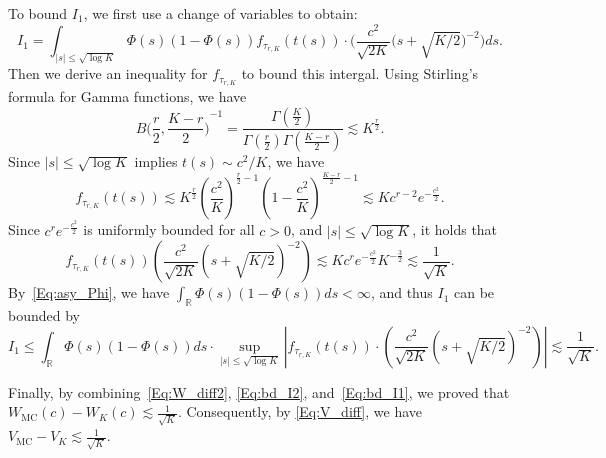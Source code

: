 \documentclass[%
onefignum,onetabnum]{siamonline250211}
\newcommand{\bbR}{\mathbb R}
\begin{document}
To bound $I_1$, we first use a change of variables to obtain:
\begin{equation}
    I_1=\int_{|s|\leq \sqrt{\log{K}}}\Phi \left( s \right)\left( 1-\Phi \left( s \right) \right) f_{\tau_{r,K}}(t(s))\cdot \Big( \frac{c^2}{\sqrt{2K}}\big( s+\sqrt{{K}/{2}} \big)^{-2} \Big) ds.
\end{equation}
Then we derive an inequality for $f_{\tau_{r,K}}$ to bound this intergal. Using Stirling's formula for Gamma functions, we have
\begin{equation*}
    {B\Big( \frac{r}{2},\frac{K-r}{2} \Big)}^{-1}=\frac{\Gamma(\frac{K}{2})}{\Gamma(\frac{r}{2})\Gamma(\frac{K-r}{2})}\lesssim K^{\frac{r}{2}}.
\end{equation*}
Since $|s|\leq \sqrt{\log{K}}$ implies $t(s)\sim {c^2}/{K}$, we have 
\begin{equation*}
    f_{\tau_{r,K}}(t(s))\lesssim K^{\frac{r}{2}} \left( \frac{c^2}{K} \right)^{\frac{r}{2}-1} \left( 1-\frac{c^2}{K} \right)^{\frac{K-r}{2}-1} \lesssim K c^{r-2}e^{-\frac{c^2}{2}}.
\end{equation*}
Since $c^re^{-\frac{c^2}{2}}$ is uniformly bounded for all $c>0$, and $|s|\leq \sqrt{\log{K}}$, it holds that
\begin{equation*}
    f_{\tau_{r,K}}(t(s)) \left( \frac{c^2}{\sqrt{2K}}\left( s+\sqrt{{K}/{2}} \right)^{-2} \right)\lesssim K c^{r}e^{-\frac{c^2}{2}}K^{-\frac{3}{2}}\lesssim\frac{1}{\sqrt{K}}.
\end{equation*}
%
By~\eqref{Eq:asy_Phi}, we have $\int_\bbR \Phi \left( s \right)\left( 1-\Phi \left( s \right) \right)ds <\infty$, and thus $I_1$ can be bounded by
\begin{equation}\label{Eq:bd_I1}
    I_1\leq \int_\bbR \Phi \left( s \right)\left( 1-\Phi \left( s \right) \right)ds\cdot\sup_{|s|\leq \sqrt{\log{K}}}\left| f_{\tau_{r,K}}(t(s))\cdot \left( \frac{c^2}{\sqrt{2K}}\left( s+\sqrt{{K}/{2}} \right)^{-2} \right) \right|
    \lesssim \frac{1}{\sqrt{K}}.
\end{equation}

Finally, by combining~\eqref{Eq:W_diff2}, \eqref{Eq:bd_I2}, and~\eqref{Eq:bd_I1}, we proved that $W_{\mathrm{MC}}(c)-W_K(c)\lesssim \frac{1}{\sqrt{K}}$. Consequently, by \eqref{Eq:V_diff}, we have $V_{\mathrm{MC}}-V_K\lesssim \frac{1}{\sqrt{K}}$.
\end{document}
